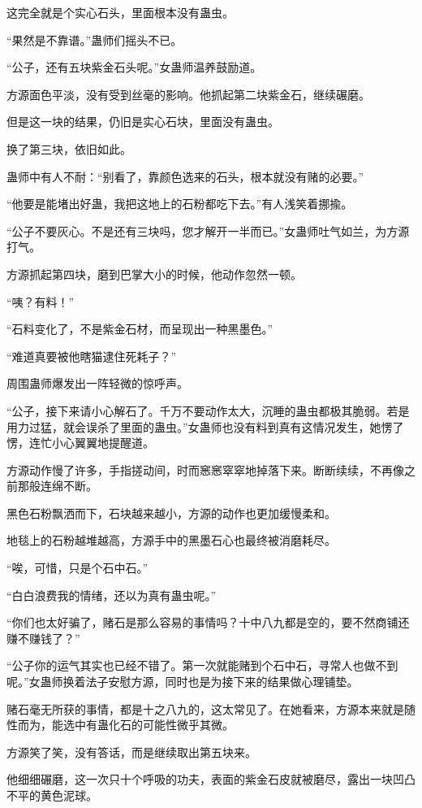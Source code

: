 \begin{this_body}
这完全就是个实心石头，里面根本没有蛊虫。

“果然是不靠谱。”蛊师们摇头不已。

“公子，还有五块紫金石头呢。”女蛊师温养鼓励道。

方源面色平淡，没有受到丝毫的影响。他抓起第二块紫金石，继续碾磨。

但是这一块的结果，仍旧是实心石块，里面没有蛊虫。

换了第三块，依旧如此。

蛊师中有人不耐：“别看了，靠颜色选来的石头，根本就没有赌的必要。”

“他要是能堵出好蛊，我把这地上的石粉都吃下去。”有人浅笑着挪揄。

“公子不要灰心。不是还有三块吗，您才解开一半而已。”女蛊师吐气如兰，为方源打气。

方源抓起第四块，磨到巴掌大小的时候，他动作忽然一顿。

“咦？有料！”

“石料变化了，不是紫金石材，而呈现出一种黑墨色。”

“难道真要被他瞎猫逮住死耗子？”

周围蛊师爆发出一阵轻微的惊呼声。

“公子，接下来请小心解石了。千万不要动作太大，沉睡的蛊虫都极其脆弱。若是用力过猛，就会误杀了里面的蛊虫。”女蛊师也没有料到真有这情况发生，她愣了愣，连忙小心翼翼地提醒道。

方源动作慢了许多，手指搓动间，时而窸窸窣窣地掉落下来。断断续续，不再像之前那般连绵不断。

黑色石粉飘洒而下，石块越来越小，方源的动作也更加缓慢柔和。

地毯上的石粉越堆越高，方源手中的黑墨石心也最终被消磨耗尽。

“唉，可惜，只是个石中石。”

“白白浪费我的情绪，还以为真有蛊虫呢。”

“你们也太好骗了，赌石是那么容易的事情吗？十中八九都是空的，要不然商铺还赚不赚钱了？”

“公子你的运气其实也已经不错了。第一次就能赌到个石中石，寻常人也做不到呢。”女蛊师换着法子安慰方源，同时也是为接下来的结果做心理铺垫。

赌石毫无所获的事情，都是十之八九的，这太常见了。在她看来，方源本来就是随性而为，能选中有蛊化石的可能性微乎其微。

方源笑了笑，没有答话，而是继续取出第五块来。

他细细碾磨，这一次只十个呼吸的功夫，表面的紫金石皮就被磨尽，露出一块凹凸不平的黄色泥球。

\end{this_body}

